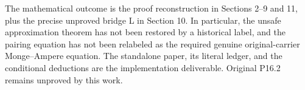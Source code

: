 \documentclass[
  10pt,
]{article}
\begin{document}
The mathematical outcome is the proof reconstruction in Sections 2--9
and 11, plus the precise unproved bridge L in Section 10. In particular,
the unsafe approximation theorem has not been restored by a historical
label, and the pairing equation has not been relabeled as the required
genuine original-carrier Monge--Ampere equation. The standalone paper,
its literal ledger, and the conditional deductions are the
implementation deliverable. Original P16.2 remains unproved by this
work.
\end{document}
